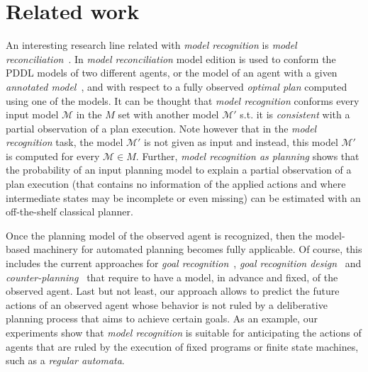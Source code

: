 \documentclass[letterpaper]{article} %
\newcommand{\strips}{\textsc{Strips}}     %
\begin{document}
\section{Related work}
\label{sec:related}
An interesting research line related with {\em model recognition} is {\em model reconciliation}~\cite{ChakrabortiSZK17}. In {\em model reconciliation} model edition is used to conform the PDDL models of two different agents, or the model of an agent with a given {\em annotated model}~\cite{sreedharan2018handling}, and with respect to a fully observed {\em optimal plan} computed using one of the models. It can be thought that {\em model recognition} conforms every input model $\mathcal{M}$ in the $M$ set with another model $\mathcal{M}'$ s.t. it is {\em consistent} with a partial observation of a plan execution. Note however that in the {\em model recognition} task, the model $\mathcal{M}'$ is not given as input and instead, this model $\mathcal{M}'$ is computed for every $\mathcal{M}\in M$. Further, {\em model recognition as planning} shows that the probability of an input planning model to explain a partial observation of a plan execution (that contains no information of the applied actions and where intermediate states may be incomplete or even missing) can be estimated with an off-the-shelf classical planner.

Once the planning model of the observed agent is recognized, then the model-based machinery for automated planning becomes fully applicable. Of course, this includes the current approaches for {\em goal recognition}~\cite{ramirez2012plan}, {\em goal recognition design}~\cite{KerenGK14} and {\em counter-planning}~\cite{pozanco2018counterplanning} that require to have a model, in advance and fixed, of the observed agent. Last but not least, our approach allows to predict the future actions of an observed agent whose behavior is not ruled by a deliberative planning process that aims to achieve certain goals. As an example, our experiments show that {\em model recognition} is suitable for anticipating the actions of agents that are ruled by the execution of fixed programs or finite state machines, such as a {\em regular automata}.  

\end{document}
